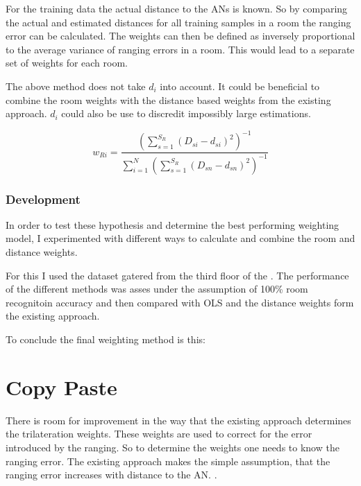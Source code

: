 For the training data the actual distance to the ANs is known. So by comparing the actual and estimated distances for all training samples in a room the ranging error can be calculated. The weights can then be defined as inversely proportional to the average variance of ranging errors in a room. This would lead to a separate set of weights for each room.

The above method does not take \(d_i\) into account. It could be beneficial to combine the room weights with the distance based weights from the existing approach. \(d_i\) could also be use to discredit impossibly large estimations.

\begin{equation}
w_{Ri}=\frac{(\sum_{s=1}^{S_R}{(D_{si}-d_{si})^2})^{-1}}{\sum_{i=1}^{N}{(\sum_{s=1}^{S_R}{(D_{sn}-d_{sn})^2})^{-1}}}
\end{equation}


\subsubsection{Development}
\label{WeightingModelDefinition}

In order to test these hypothesis and determine the best performing weighting model, I experimented with different ways to calculate and combine the room and distance weights.

For this I used the dataset gatered from the third floor of the . The performance of the different methods was asses under the assumption of 100\% room recognitoin accuracy and then compared with OLS and the distance weights form the existing approach.


To conclude the final weighting method is this:



\section{Copy Paste}
There is room for improvement in the way that the existing approach determines the trilateration weights. These weights are used to correct for the error introduced by the ranging. So to determine the weights one needs to know the ranging error. The existing approach makes the simple assumption, that the ranging error increases with distance to the AN. .

